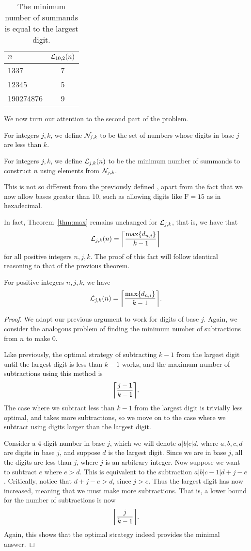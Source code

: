 \begin{table}[H]
  \centering
  \begin{tabular}{lc} \toprule
    $n$ & $\LTen(n)$ \\ \midrule
    1337 & 7 \\
    12345 & 5 \\
    190274876 & 9 \\ \bottomrule
  \end{tabular}
  \caption{The minimum number of summands is equal to the largest digit.}
  \label{t1}
\end{table}
We now turn our attention to the second part of the problem. 
\begin{definition}
  For integers $j, k$, we define $\NN_{j, k}$ to be the set of numbers whose digits in base $j$ are less than $k$.
\end{definition}
\begin{definition}
  For integers $j, k$, we define $\LL_{j, k}(n)$ to be the minimum number of summands to construct $n$ using elements from $\NN_{j, k}$.
\end{definition}
This is not so different from the previously defined \NTen, apart from the fact that we now allow bases greater than $10$, such as allowing digits like $\mathrm{F}=15$ as in hexadecimal.

In fact, Theorem~\ref{thm:max} remains unchanged for $\LL_{j, k}$, that is, we have that \[
  \LL_{j, k}(n) = \ceil*{\frac{\max\{d_{n, i}\}}{k-1}}
\] for all positive integers $n, j, k$. The proof of this fact will follow identical reasoning to that of the previous theorem.
 \begin{theorem}
   For positive integers $n, j, k$, we have \[
  \LL_{j, k}(n) = \ceil*{\frac{\max\{d_{n, i}\}}{k-1}}.
\]
\end{theorem}
\begin{proof}
  We adapt our previous argument to work for digits of base $j$. Again, we consider the analogous problem of finding the minimum number of subtractions from $n$ to make $0$. 

  Like previously, the optimal strategy of subtracting $k-1$ from the largest digit until the largest digit is less than $k-1$ works, and the maximum number of subtractions using this method is  \[
    \ceil*{\frac{j-1}{k-1}}
  .\] The case where we subtract less than $k-1$ from the largest digit is trivially less optimal, and takes more subtractions, so we move on to the case where we subtract using digits larger than the largest digit.

  Consider a 4-digit number in base $j$, which we will denote $a|b|c|d$, where $a, b, c, d$ are digits in base $j$, and suppose $d$ is the largest digit. Since we are in base $j$, all the digits are less than $j$, where $j$ is an arbitrary integer. Now suppose we want to subtract $e$ where $e > d$. This is equivalent to the subtraction $a | b | c-1 | d+j - e$. Critically, notice that $d+j-e > d$, since  $j>e$. Thus the largest digit has now increased, meaning that we must make more subtractions. That is, a lower bound for the number of subtractions is now \[
    \ceil*{\frac{j}{k-1}}.
  \] Again, this shows that the optimal strategy indeed provides the minimal answer.
\end{proof}
